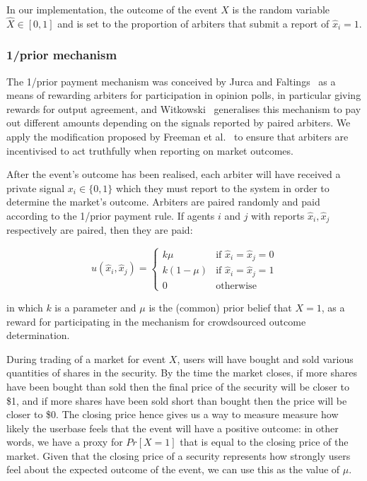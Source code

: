 \documentclass[10pt,a4paper]{article}
\theoremstyle{plain}
\theoremstyle{definition}
\begin{document}
In our implementation, the outcome of the event $X$ is the random variable
$\hat{X} \in [0,1]$ and is set to the proportion of arbiters that submit a
report of $\hat{x}_i = 1$.

\subsubsection{1/prior mechanism}

\label{sec:oneOverPrior}

The 1/prior payment mechanism was conceived by Jurca and
Faltings~\cite{JurcaFaltings2008, JurcaFaltings2011} as a means of rewarding
arbiters for participation in opinion polls, in particular giving rewards for
output agreement, and Witkowski~\cite{Witkowski2014} generalises this mechanism
to pay out different amounts depending on the signals reported by paired
arbiters. We apply the modification proposed by Freeman et al.~\cite{CODiPM} to
ensure that arbiters are incentivised to act truthfully when reporting on
market outcomes.

After the event's outcome has been realised, each arbiter will have received a
private signal $x_i \in \{0,1\}$ which they must report to the system in order
to determine the market's outcome. Arbiters are paired randomly and paid
according to the 1/prior payment rule. If agents $i$ and $j$ with reports
$\hat{x}_i, \hat{x}_j$ respectively are paired, then they are paid:

\begin{equation}
	\label{eq:oneOverPrior}
	u(\hat{x}_i, \hat{x}_j) =
	\begin{cases}
		k \mu & \text{if } \hat{x}_i = \hat{x}_j = 0 \\
		k (1-\mu) & \text{if } \hat{x}_i = \hat{x}_j = 1 \\
		0 & \text{otherwise}
	\end{cases}
\end{equation}

in which $k$ is a parameter and $\mu$ is the (common) prior belief that $X=1$,
as a reward for participating in the mechanism for crowdsourced outcome
determination.

During trading of a market for event $X$, users will have bought and sold
various quantities of shares in the security. By the time the market closes, if
more shares have been bought than sold then the final price of the security
will be closer to \$1, and if more shares have been sold short than bought then
the price will be closer to \$0. The closing price hence gives us a way to
measure measure how likely the userbase feels that the event will have a
positive outcome: in other words, we have a proxy for $Pr[X=1]$ that is equal
to the closing price of the market. Given that the closing price of a security
represents how strongly users feel about the expected outcome of the event, we
can use this as the value of $\mu$.
\end{document}
